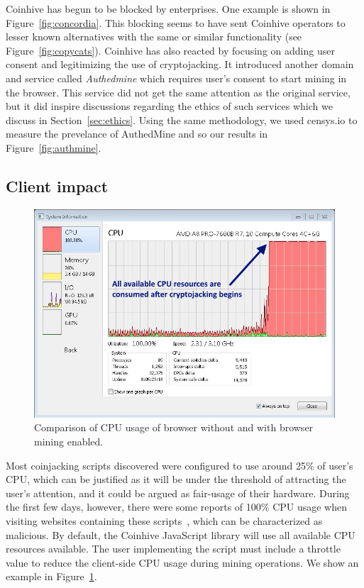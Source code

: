 Coinhive has begun to be blocked by enterprises. One example is shown in Figure~\ref{fig:concordia}. This blocking seems to have sent Coinhive operators to lesser known alternatives with the same or similar functionality (see Figure~\ref{fig:copycats}). Coinhive has also reacted by focusing on adding user consent and legitimizing the use of cryptojacking. It introduced another domain and service called \textit{Authedmine} which requires user's consent to start mining in the browser. This service did not get the same attention as the original service, but it did inspire discussions regarding the ethics of such services which we discuss in Section~\ref{sec:ethics}. Using the same methodology, we used censys.io to measure the prevelance of AuthedMine and so our results in Figure~\ref{fig:authmine}. 

\subsection{Client impact}

\begin{figure}[t]
\centering
\includegraphics[width=\linewidth]{figures/windows_cpu_usage.png}
	\caption{Comparison of CPU usage of browser without and with browser mining enabled.\label{fig:cpu}}
\end{figure}

Most coinjacking scripts discovered were configured to use around 25\% of user's CPU, which can be justified as it will be under the threshold of attracting the user's attention, and it could be argued as fair-usage of their hardware. During the first few days, however, there were some reports of 100\% CPU usage when visiting websites containing these scripts~\cite{piratesbayblog}, which can be characterized as malicious. By default, the Coinhive JavaScript library will use all available CPU resources available. The user implementing the script must include a throttle value to reduce the client-side CPU usage during mining operations. We show an example in Figure~\ref{fig:cpu}.


